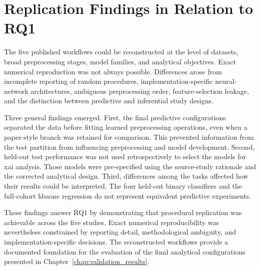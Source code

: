 \FloatBarrier

\section{Replication Findings in Relation to RQ1}

The five published workflows could be reconstructed at the level of datasets, broad preprocessing stages, model families, and analytical objectives. Exact numerical reproduction was not always possible. Differences arose from incomplete reporting of random procedures, implementation-specific neural-network architectures, ambiguous preprocessing order, feature-selection leakage, and the distinction between predictive and inferential study designs.

Three general findings emerged. First, the final predictive configurations separated the data before fitting learned preprocessing operations, even when a paper-style branch was retained for comparison. This prevented information from the test partition from influencing preprocessing and model development. Second, held-out test performance was not used retrospectively to select the models for \gls{xai} analysis. Those models were pre-specified using the source-study rationale and the corrected analytical design. Third, differences among the tasks affected how their results could be interpreted. The four held-out binary classifiers and the full-cohort \gls{hbaone} regression do not represent equivalent predictive experiments.

These findings answer RQ1 by demonstrating that procedural replication was achievable across the five studies. Exact numerical reproducibility was nevertheless constrained by reporting detail, methodological ambiguity, and implementation-specific decisions. The reconstructed workflows provide a documented foundation for the evaluation of the final analytical configurations presented in Chapter~\ref{chap:validation_results}.